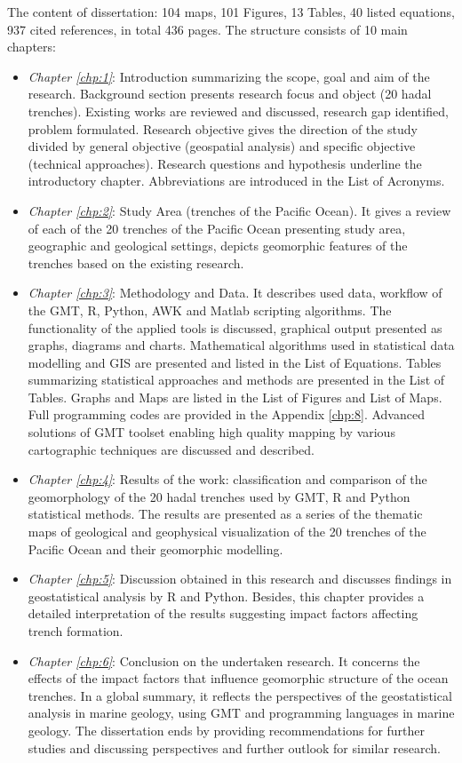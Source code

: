 \documentclass[11pt,a4paper]{report}
\begin{document}
The content of dissertation: 104 maps, 101 Figures, 13 Tables, 40 listed equations, 937 cited references, in total 436 pages. The structure consists of 10 main chapters:
\begin{itemize}
	\item \textit{Chapter \ref{chp:1}}: Introduction summarizing the scope, goal and aim of the research. Background section presents research focus and object (20 hadal trenches). Existing works are reviewed and discussed, research gap identified, problem formulated. Research objective gives the direction of the study divided by general objective (geospatial analysis) and specific objective (technical approaches). Research questions and hypothesis underline the introductory chapter. Abbreviations are introduced in the List of Acronyms.
	\item \textit{Chapter \ref{chp:2}}: Study Area (trenches of the Pacific Ocean). It gives a review of each of the 20 trenches of the Pacific Ocean presenting study area, geographic and geological settings, depicts geomorphic features of the trenches based on the existing research. 
	\item \textit{Chapter \ref{chp:3}}: Methodology and Data. It describes used data, workflow of the \ac{GMT}, R, Python, AWK and Matlab scripting algorithms. The functionality of the applied tools is discussed, graphical output presented as graphs, diagrams and charts. Mathematical algorithms used in statistical data modelling and \ac{GIS} are presented and listed in the List of Equations. Tables summarizing statistical approaches and methods are presented in the List of Tables. Graphs and Maps are listed in the List of Figures and List of Maps. Full programming codes are provided in the Appendix \ref{chp:8}. Advanced solutions of \ac{GMT} toolset enabling high quality mapping by various cartographic techniques are discussed and described. 
	\item \textit{Chapter \ref{chp:4}}: Results of the work: classification and comparison of the geomorphology of the 20 hadal trenches used by \ac{GMT}, R and Python statistical methods. The results are presented as a series of the thematic maps of geological and geophysical visualization of the 20 trenches of the Pacific Ocean and their geomorphic modelling.  
	\item \textit{Chapter \ref{chp:5}}: Discussion obtained in this research and discusses findings in geostatistical analysis by R and Python. Besides, this chapter provides a detailed interpretation of the results suggesting impact factors affecting trench formation.
	\item \textit{Chapter \ref{chp:6}}: Conclusion on the undertaken research. It concerns the effects of the impact factors that influence geomorphic structure of the ocean trenches. In a global summary, it reflects the perspectives of the geostatistical analysis in marine geology, using \ac{GMT} and programming languages in marine geology. The dissertation ends by providing recommendations for further studies and discussing perspectives and further outlook for similar research.
 \end{itemize}
 
\end{document}
